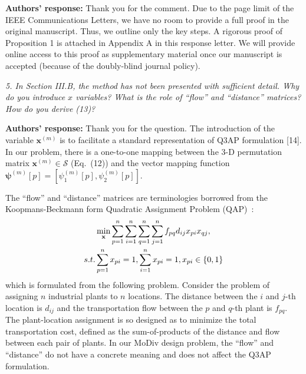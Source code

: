 \documentclass[onecolumn, 11pt, draftclsnofoot]{IEEEtran}
\begin{document}
\noindent \textbf{Authors' response:}
Thank you for the comment. Due to the page limit of the IEEE Communications
Letters, we have no room to provide a full proof in the original manuscript. Thus, we
outline only the key steps. A rigorous proof of Proposition 1 is attached
in Appendix A in this response letter. We will provide online access to this proof as
supplementary material once our manuscript is accepted (because of the doubly-blind
journal policy). 
 
\vspace{0.5cm}

\noindent
\emph{5. In Section III.B, the method has not been presented with sufficient
detail. Why do you introduce $x$ variables? What is the role of ``flow'' and
``distance'' matrices? How do you derive (13)?}

\noindent \textbf{Authors' response:}
Thank you for the question. The introduction of the variable $\mathbf{x}^{(m)}$
is to facilitate a standard representation of Q3AP formulation
[14]\citep[R][]{frieze1974bilinear}\citep[R][]{balas1991algorithm}\citep[R][]{burkard1999linear}\citep[R][]{5587019}.
In our problem, there is a one-to-one mapping between the 3-D permutation matrix
$\mathbf{x}^{(m)}\in\mathcal{S}$ (Eq.~(12)) and the vector mapping function
$\bm{\psi}^{(m)}[p] = [\psi_1^{(m)}[p], \psi_2^{(m)}[p]]$. 

The ``flow'' and ``distance'' matrices are terminologies borrowed from the
Koopmans-Beckmann form Quadratic Assignment Problem
(QAP)~\citep[R][]{koopmans1957assignment}\citep[R][]{806935}:
\begin{align}
  & \min_{\mathbf{x}}
  \sum_{p=1}^{n}\sum_{i=1}^{n}
  \sum_{q=1}^{n}\sum_{j=1}^{n}
  f_{pq}d_{ij}x_{pi}x_{qj},\notag\\
  \mbox{s.t. } & \sum_{p=1}^{n}x_{pi} =
  1,\sum_{i=1}^{n}x_{pi} = 1, x_{pi}\in\{0, 1\}
\end{align}
which is formulated from the following problem. Consider the problem of
assigning $n$ industrial plants to $n$ locations. The distance between the $i$
and $j$-th location is $d_{ij}$ and the transportation flow between the $p$ and
$q$-th plant is $f_{pq}$. The plant-location assignment is so designed as to
minimize the total transportation cost, defined as the sum-of-products of the
distance and flow between each pair of plants. In our MoDiv design problem, the
``flow'' and ``distance'' do not have a concrete meaning and does not affect
the Q3AP formulation.
\end{document}
